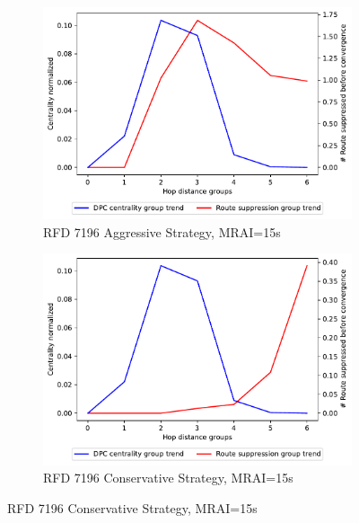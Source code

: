 \begin{figure}[H]
\begin{subfigure}[b]{0.325\textwidth}
     \end{subfigure}
     \hfill
     \begin{subfigure}[b]{0.325\textwidth}
         \centering
         \includegraphics[width=\textwidth]{images/RFD/miceVSelephants/MultiMRAI/15/mice/cisco_1000_RFD_7196_aggressive_nodeConvergence_centVSsup_trend.pdf}
         \caption{RFD 7196 Aggressive Strategy, MRAI=15s}
         \label{fig:1000_7196RFDA_centVSsup_mices}
     \end{subfigure}
     \hfill
     \begin{subfigure}[b]{0.325\textwidth}
         \centering
         \includegraphics[width=\textwidth]{images/RFD/miceVSelephants/MultiMRAI/15/mice/cisco_1000_RFD_7196_conservative_nodeConvergence_centVSsup_trend.pdf}
         \caption{RFD 7196 Conservative Strategy, MRAI=15s}
         \label{fig:1000_7196RFDC_centVSsup_mices}

\end{subfigure}
\end{figure}
